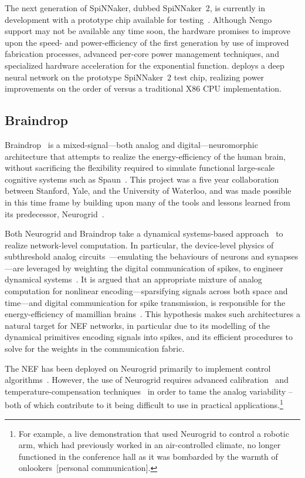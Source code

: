 The next generation of SpiNNaker, dubbed SpiNNaker~2, is currently in development with a prototype chip available for testing~\citep{liu2018memory}.
Although Nengo support may not be available any time soon, the hardware promises to improve upon the speed- and power-efficiency of the first generation by use of improved fabrication processes, advanced per-core power management techniques, and specialized hardware acceleration for the exponential function.
\citet{liu2018memory} deploys a deep neural network on the prototype SpiNNaker~2 test chip, realizing power improvements on the order of  versus a traditional X86 CPU implementation.

\subsection{Braindrop}

Braindrop~\citep{braindrop2019} is a mixed-signal---both analog and digital---neuromorphic architecture that attempts to realize the energy-efficiency of the human brain, without sacrificing the flexibility required to simulate functional large-scale cognitive systems such as Spaun~\citep{eliasmith2012}.
This project was a five year collaboration between Stanford, Yale, and the University of Waterloo, and was made possible in this time frame 
by building upon many of the tools and lessons learned from its predecessor, Neurogrid~\citep{neurogrid2014}. 

Both Neurogrid and Braindrop take a dynamical systems-based approach~\citep{arthur2011silicon, gao2012dynamical} to realize network-level computation.
In particular, the device-level physics of subthreshold analog circuits~\citep{andreou1991current}---emulating the behaviours of neurons and synapses---are leveraged by weighting the digital communication of spikes, to engineer dynamical systems~\citep{dethier2011brain}.
It is argued that an appropriate mixture of analog computation for nonlinear encoding---sparsifying signals across both space and time---and digital communication for spike transmission, is responsible for the energy-efficiency of mamillian brains~\citep{boahen2017neuromorph}.
This hypothesis makes such architectures a natural target for NEF networks, in particular due to its modelling of the dynamical primitives encoding signals into spikes, and its efficient procedures to solve for the weights in the communication fabric.

The NEF has been deployed on Neurogrid primarily to implement control algorithms~\citep{dethier2011brain, choudhary2012silicon, menon2014controlling}.
However, the use of Neurogrid requires advanced calibration~\citep{kauderer2017calibrating} and temperature-compensation techniques~\citep{abrams2017} in order to tame the analog variability -- both of which contribute to it being difficult to use in practical applications.\footnote{
For example, a live demonstration that used Neurogrid to control a robotic arm, which had previously worked in an air-controlled climate, no longer functioned in the conference hall as it was bombarded by the warmth of onlookers~[personal communication].}


